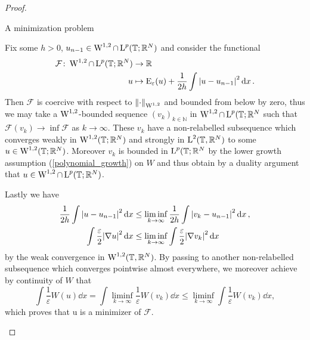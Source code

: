 \begin{proof}
	\begin{description}[wide=0pt]
		\item[Step 1:] A minimization problem
		
		Fix some $ h > 0 $, $ u_{ n - 1 } \in \operatorname{W}^{1 , 2 }\cap \operatorname{L}^{ p } ( \mathbb{ T }; \mathbb{ R }^{ N } ) $ and consider the functional
		\begin{align}
			\label{de_giorgi_min_functional}
			\mathcal{ F } \colon \operatorname{W}^{ 1, 2 } \cap \operatorname{L}^{ p } ( \mathbb{ T } ; \mathbb{ R }^{ N } )
			& \to
			\mathbb{ R }
			\\
			u & \mapsto 
			\operatorname{E}_{ \varepsilon } ( u ) + 
			\frac{ 1 }{ 2h } \int \abs{ u - u_{ n - 1 } }^{ 2 } \dd{x }
			\notag .
		\end{align}
		Then $ \mathcal{ F } $ is coercive with respect to 
		$ \norm{ \cdot }_{ \operatorname{W}^{ 1, 2 } } $ 
		and bounded from below by zero, thus we may take a $ \operatorname{W}^{ 1 , 2 } $-bounded sequence  
		$ (v_{ k } )_{ k \in \mathbb{ N } } $ in $ \operatorname{W}^{ 1 , 2} \cap \operatorname{L}^{ p } ( \mathbb{ T } ; \mathbb{ R }^{ N } $ such that 
		$ \mathcal{ F } ( v_{ k } ) \to \inf \mathcal{ F } $ as $ k \to \infty $. 
		These $ v_{ k } $ have a non-relabelled subsequence which converges weakly in $ \operatorname{W}^{ 1 , 2 } ( \mathbb{ T } ; \mathbb{ R }^{ N } ) $ and strongly in $ \operatorname{L}^{ 2 } ( \mathbb{ T }, \mathbb{ R }^{ N } ) $ to some $ u \in \operatorname{W}^{ 1, 2 } ( \mathbb{ T }; \mathbb{ R }^{ N } ) $.
		Moreover $ v_{ k } $ is bounded in $ \operatorname{L}^{ p } ( \mathbb{ T } ; \mathbb{ R }^{ N } $ by the lower growth assumption (\ref{polynomial_growth}) on $ W $
		and thus obtain by a duality argument that $ u \in \operatorname{W}^{ 1 , 2 } \cap \operatorname{L}^{ p } ( \mathbb{ T } ; \mathbb{ R }^{ N } ) $.
		
		Lastly we have 
		\begin{align}
			\frac{ 1 }{ 2 h }
			\int \abs{ u - u_{ n - 1 } }^{ 2 } \dd{ x}
			& \leq
			\liminf_{ k \to \infty }
			\frac{ 1 }{ 2h }
			\int \abs{ v_{ k } - u_{ n -1 } }^{ 2 } \dd{ x },
			\\
			\int \frac{ \varepsilon }{ 2 } \abs{ \nabla u }^{ 2 } \dd{ x }
			& \leq
			\liminf_{ k \to \infty }
				\int \frac{ \varepsilon }{ 2 } \abs{ \nabla v_{ k } }^{ 2 } \dd{ x }
		\end{align}
	by the weak convergence in $ \operatorname{W}^{ 1 , 2 } ( \mathbb{ T } , \mathbb{ R }^{ N } )$.
	By passing to another non-relabelled subsequence which converges pointwise almost everywhere, we moreover achieve by continuity of $ W $ that
	\begin{equation*}
		\int \frac{ 1 }{ \varepsilon } W ( u ) \dd{ x }
		=
		\int \liminf_{ k \to \infty } \frac{ 1 }{ \varepsilon } W ( v_{k } ) \dd{ x }
		\leq
		\liminf_{ k \to \infty } \int \frac{ 1 }{ \varepsilon } W ( v_{ k } ) \dd{x},
	\end{equation*}
	which proves that u is a minimizer of $ \mathcal{ F } $.
	

\end{description}
\end{proof}
